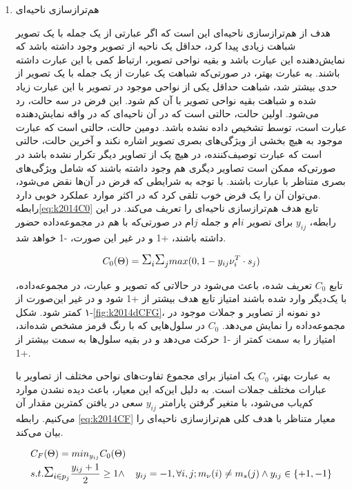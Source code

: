 \begin{enumerate}
\item هم‌ترازسازی ناحیه‌ای 

هدف از هم‌ترازسازی ناحیه‌ای این است که اگر عبارتی از یک جمله با یک تصویر شباهت زیادی پیدا کرد، حداقل یک ناحیه از تصویر وجود داشته باشد که نمایش‌دهنده این عبارت باشد و بقیه نواحی تصویر، ارتباط کمی با این عبارت داشته باشند. به عبارت بهتر، در صورتی‌که شباهت یک عبارت از یک جمله با یک تصویر از حدی بیشتر شد، شباهت حداقل یکی از نواحی موجود در تصویر با این عبارت زیاد شده و شباهت بقیه نواحی تصویر با آن کم شود. این فرض در سه حالت، رد می‌شود. اولین حالت، حالتی است که در آن ناحیه‌ای که در واقه نمایش‌دهنده عبارت است، توسط  تشخیص داده نشده باشد. دومین حالت، حالتی است که عبارت موجود به هیچ بخشی از ویژگی‌های بصری تصویر اشاره نکند و آخرین حالت، حالتی است که عبارت توصیف‌کننده، در هیچ یک از تصاویر دیگر تکرار نشده باشد در صورتی‌که ممکن است تصاویر دیگری هم وجود داشته باشند که شامل ویژگی‌های بصری متناظر با عبارت باشند. با توجه به شرایطی که فرض در آن‌ها نقض می‌شود، می‌توان آن را یک فرض خوب تلقی کرد که در اکثر موارد عملکرد خوبی دارد.
\\
رابطه\ref{eq:k2014C0}
تابع هدف هم‌ترازسازی ناحیه‌ای را تعریف‌ می‌کند. در این رابطه، $y_{ij}$ برای تصویر $i$ام و جمله $j$ام در صورتی‌که با هم در مجموعه‌داده حضور داشته باشند، +1 و در غیر این‌ صورت، -1 خواهد شد.

\begin{equation}
C_0(\Theta) = \ML{\Sigma}_i \ML{\Sigma}_j max(0 , 1 - y_{ij} \nu_i^T \cdot s_j)
\label{eq:k2014C0}
\end{equation}

تابع $C_0$ تعریف شده، باعث می‌شود در حالاتی که تصویر و عبارت، در مجموعه‌داده، با یک‌دیگر وارد شده باشند امتیاز تابع هدف بیشتر از +1 شود و در غیر این‌صورت از -۱ کمتر شود. شکل\ref{fig:k2014dCFG}،
 دو نمونه از تصاویر و جملات موجود در مجموعه‌داده را نمایش می‌دهد. 
 $C_0$ 
 در سلول‌هایی که با رنگ قرمز مشخص شده‌اند، امتیاز را به سمت کمتر از -1 حرکت می‌دهد و در بقیه سلول‌ها به سمت بیشتر از +1.

به عبارت بهتر، $C_0$ یک امتیاز برای مجموع تفاوت‌های نواحی مختلف از تصاویر با عبارات مختلف جملات است. به دلیل این‌که این معیار، باعث دیده نشدن موارد کم‌یاب می‌شود، با متغیر گرفتن پارامتر $y_{ij}$ سعی در یافتن کمترین مقدار آن می‌کنیم. رابطه 
\ref{eq:k2014CF}
معیار متناظر با هدف کلی هم‌ترازسازی ناحیه‌ای را بیان می‌کند.

\begin{align}
&C_F(\Theta) = min_{y_{ij}} C_0(\Theta)
\nonumber
\\
&s.t. \ML{\Sigma}_{i \in p_j} \frac{y_{ij} + 1}{2} \geq 1 \land
&y_{ij} = -1, \forall i,j ; m_\nu(i) \neq m_s(j) \land y_{ij} \in \{+1, -1\}
\label{eq:k2014CF}
\end{align}


\end{enumerate}
